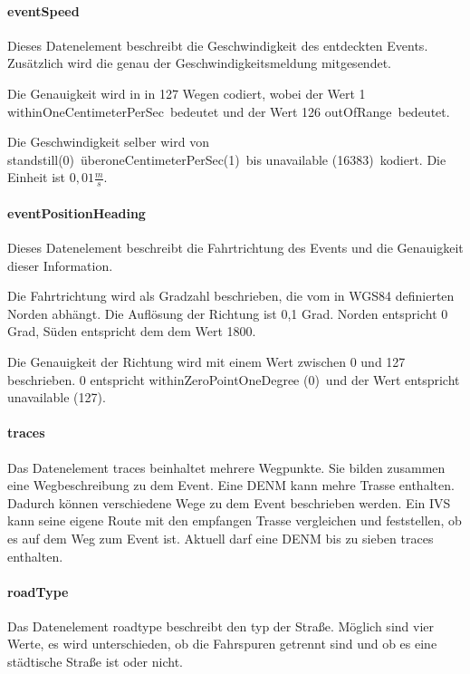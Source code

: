 \paragraph{eventSpeed}
Dieses Datenelement beschreibt die Geschwindigkeit des entdeckten Events. Zusätzlich wird die genau der Geschwindigkeitsmeldung mitgesendet. 

Die Genauigkeit wird in in 127 Wegen codiert, wobei der Wert 1 \glqq withinOneCentimeterPerSec\grqq~bedeutet und der Wert 126 \glqq outOfRange\grqq~bedeutet. 

Die Geschwindigkeit selber wird von \glqq standstill(0)\grqq~über\glqq oneCentimeterPerSec(1)\grqq~bis \glqq unavailable (16383)\glqq~kodiert. Die Einheit ist $0,01 \frac{m}{s}$.

\paragraph{eventPositionHeading}
Dieses Datenelement beschreibt die Fahrtrichtung des Events und die Genauigkeit dieser Information. 

Die Fahrtrichtung wird als Gradzahl beschrieben, die vom in WGS84 definierten Norden abhängt. Die Auflösung der Richtung ist 0,1 Grad. Norden entspricht 0 Grad, Süden entspricht dem dem Wert 1800.

Die Genauigkeit der Richtung wird mit einem Wert zwischen 0 und 127 beschrieben. 0 entspricht \glqq withinZeroPointOneDegree (0)\grqq~und der Wert entspricht \glqq unavailable (127)\grqq.

\paragraph{traces}
Das Datenelement traces beinhaltet mehrere Wegpunkte. Sie bilden zusammen eine Wegbeschreibung zu dem Event. Eine \ac{DENM} kann mehre Trasse enthalten. Dadurch können verschiedene Wege zu dem Event beschrieben werden. Ein \ac{IVS} kann seine eigene Route mit den empfangen Trasse vergleichen und feststellen, ob es auf dem Weg zum Event ist. Aktuell darf eine \ac{DENM} bis zu sieben traces enthalten.


\paragraph{roadType}
Das Datenelement roadtype beschreibt den typ der Straße. Möglich sind vier Werte, es wird unterschieden, ob die Fahrspuren getrennt sind und ob es eine städtische Straße ist oder nicht. 


